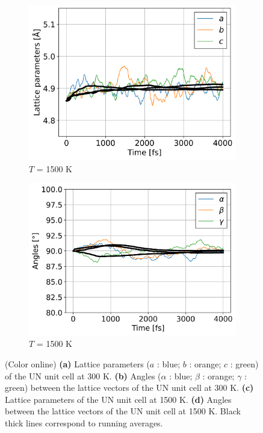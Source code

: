 \documentclass[preprint, 12pt]{elsarticle}
\newcommand{\?}{\stackrel{?}{=}}
\begin{document}
\begin{figure}[h!]
\begin{subfigure}{0.48\textwidth}
    \includegraphics[width=\textwidth]{LatConst-1500.png}
    \caption{$T$ = 1500 K}
    \label{Fig:LatConst-1500}
\end{subfigure}
\hfill
\begin{subfigure}{0.48\textwidth}
    \includegraphics[width=\textwidth]{Angles-1500.png}
    \caption{$T$ = 1500 K}
    \label{Fig:Angles-1500}
\end{subfigure}
\caption{(Color online) \textbf{(a)} Lattice parameters ($a$ : blue; $b$ : orange; $c$ : green)  of the UN unit cell at 300 K. \textbf{(b)} Angles ($\alpha$ : blue; $\beta$ : orange; $\gamma$ : green) between the lattice vectors of the UN unit cell at 300 K. \textbf{(c)} Lattice parameters of the UN unit cell at 1500 K. \textbf{(d)} Angles between the lattice vectors of the UN unit cell at 1500 K. Black thick lines correspond to running averages.}
\label{Fig:struct}
\end{figure}
\end{document}
